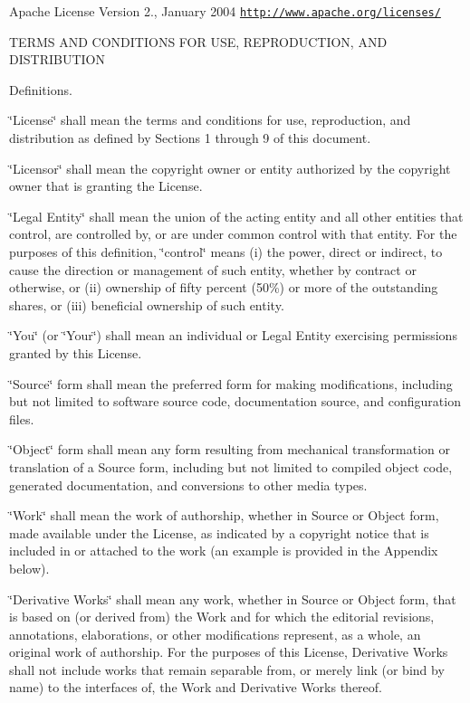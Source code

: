 Apache License Version 2., January 2004 \href{http://www.apache.org/licenses/}{\tt http\+://www.\+apache.\+org/licenses/}

T\+E\+R\+MS A\+ND C\+O\+N\+D\+I\+T\+I\+O\+NS F\+OR U\+SE, R\+E\+P\+R\+O\+D\+U\+C\+T\+I\+ON, A\+ND D\+I\+S\+T\+R\+I\+B\+U\+T\+I\+ON


\begin{DoxyEnumerate}
\item Definitions.

\char`\"{}\+License\char`\"{} shall mean the terms and conditions for use, reproduction, and distribution as defined by Sections 1 through 9 of this document.

\char`\"{}\+Licensor\char`\"{} shall mean the copyright owner or entity authorized by the copyright owner that is granting the License.

\char`\"{}\+Legal Entity\char`\"{} shall mean the union of the acting entity and all other entities that control, are controlled by, or are under common control with that entity. For the purposes of this definition, \char`\"{}control\char`\"{} means (i) the power, direct or indirect, to cause the direction or management of such entity, whether by contract or otherwise, or (ii) ownership of fifty percent (50\%) or more of the outstanding shares, or (iii) beneficial ownership of such entity.

\char`\"{}\+You\char`\"{} (or \char`\"{}\+Your\char`\"{}) shall mean an individual or Legal Entity exercising permissions granted by this License.

\char`\"{}\+Source\char`\"{} form shall mean the preferred form for making modifications, including but not limited to software source code, documentation source, and configuration files.

\char`\"{}\+Object\char`\"{} form shall mean any form resulting from mechanical transformation or translation of a Source form, including but not limited to compiled object code, generated documentation, and conversions to other media types.

\char`\"{}\+Work\char`\"{} shall mean the work of authorship, whether in Source or Object form, made available under the License, as indicated by a copyright notice that is included in or attached to the work (an example is provided in the Appendix below).

\char`\"{}\+Derivative Works\char`\"{} shall mean any work, whether in Source or Object form, that is based on (or derived from) the Work and for which the editorial revisions, annotations, elaborations, or other modifications represent, as a whole, an original work of authorship. For the purposes of this License, Derivative Works shall not include works that remain separable from, or merely link (or bind by name) to the interfaces of, the Work and Derivative Works thereof.


\end{DoxyEnumerate}
